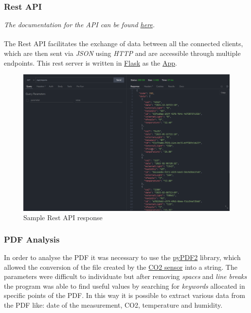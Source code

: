 \documentclass{optica-article}
\begin{document}
\vspace{8pt}
\subsubsection{Rest API}\label{sec:domotics_rest_api}
\textit{The documentation for the API can be found \hyperref[https://naonexus.notion.site/Domotics-server-22721767d69a43a6badeafcaf546b3d2]{here}.}\\
\\The Rest API facilitates the exchange of data between all the connected clients, which are then sent via \emph{JSON} using \emph{HTTP} and are accessible through multiple endpoints. This rest server is written in \hyperref[https://flask.palletsprojects.com/en/2.2.x/]{Flask} as the \hyperref[sec:domotics_web_app]{App}.

\begin{figure}[H]
    \centering
    \includegraphics[scale=0.36]{figures/sample_api_response.png}
    \caption{Sample Rest API response}
    \label{fig:rest_api_reponse}
\end{figure}

\vspace{8pt}
\subsubsection{PDF Analysis}\label{sec:domotics_pdf_analysis}
In order to analyse the PDF it was necessary to use the \hyperref[https://pypdf2.readthedocs.io/en/3.0.0/]{pyPDF2} library, which allowed the conversion of the file created by the \hyperref[sec:domotics_sensor]{CO2 sensor} into a string. The parameters were difficult to individuate but after removing \emph{spaces} and \emph{line breaks} the program was able to find useful values by searching for \emph{keywords} allocated in specific points of the PDF. In this way it is possible to extract various data from the PDF like: date of the measurement, CO2, temperature and humidity.
\end{document}
